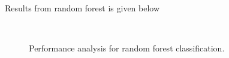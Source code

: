 Results from random forest is given below
\begin{figure}[H]
\begin{center}
     \\
\end{center}
\caption[caption]{Performance analysis for random forest classification.}
\end{figure}


